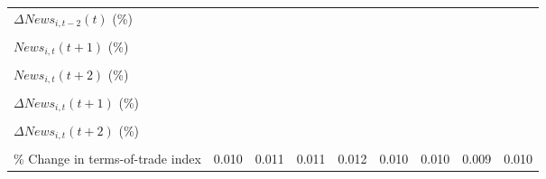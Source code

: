 {\begin{tabular}{l*{8}{c}}
\addlinespace
$ \Delta News_{i,t-2}(t)$ (\%)&                     &                     &                     &                     &                     &                     &                     &                     \\
                    &                     &                     &                     &                     &                     &                     &                     &                     \\
\addlinespace
$ News_{i,t}(t+1)$ (\%)&                     &                     &                     &                     &                     &                     &                     &                     \\
                    &                     &                     &                     &                     &                     &                     &                     &                     \\
\addlinespace
$ News_{i,t}(t+2)$ (\%)&                     &                     &                     &                     &                     &                     &                     &                     \\
                    &                     &                     &                     &                     &                     &                     &                     &                     \\
\addlinespace
$ \Delta News_{i,t}(t+1)$ (\%)&                     &                     &                     &                     &                     &                     &                     &                     \\
                    &                     &                     &                     &                     &                     &                     &                     &                     \\
\addlinespace
$ \Delta News_{i,t}(t+2)$ (\%)&                     &                     &                     &                     &                     &                     &                     &                     \\
                    &                     &                     &                     &                     &                     &                     &                     &                     \\
\addlinespace
\% Change in terms-of-trade index&       0.010         &       0.011         &       0.011         &       0.012         &       0.010         &       0.010         &       0.009         &       0.010         \\

\end{tabular}}
